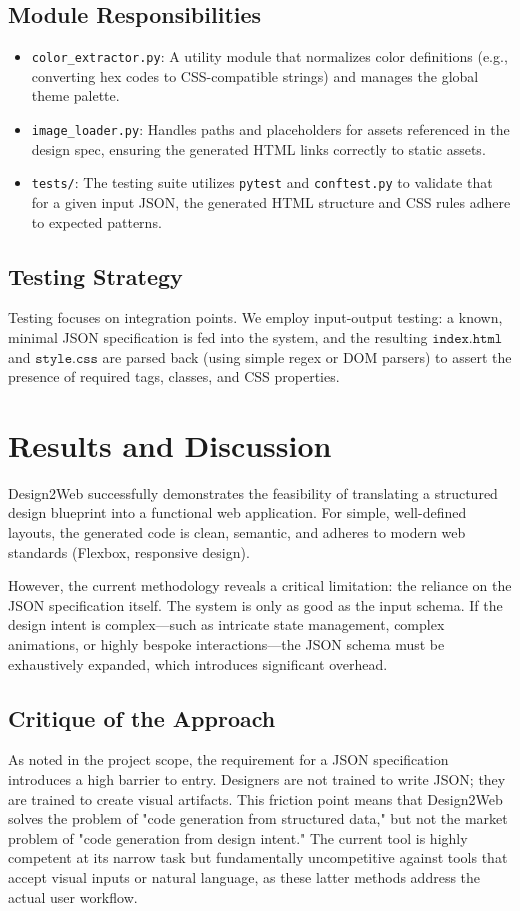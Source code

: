 \documentclass[11pt,a4paper]{article}
\begin{document}
\subsection{Module Responsibilities}
\begin{itemize}
    \item \texttt{color\_extractor.py}: A utility module that normalizes color definitions (e.g., converting hex codes to CSS-compatible strings) and manages the global theme palette.
    \item \texttt{image\_loader.py}: Handles paths and placeholders for assets referenced in the design spec, ensuring the generated HTML links correctly to static assets.
    \item \texttt{tests/}: The testing suite utilizes \texttt{pytest} and \texttt{conftest.py} to validate that for a given input JSON, the generated HTML structure and CSS rules adhere to expected patterns.
\end{itemize}

\subsection{Testing Strategy}
Testing focuses on integration points. We employ input-output testing: a known, minimal JSON specification is fed into the system, and the resulting $\texttt{index.html}$ and $\texttt{style.css}$ are parsed back (using simple regex or DOM parsers) to assert the presence of required tags, classes, and CSS properties.

\section{Results and Discussion}
Design2Web successfully demonstrates the feasibility of translating a structured design blueprint into a functional web application. For simple, well-defined layouts, the generated code is clean, semantic, and adheres to modern web standards (Flexbox, responsive design).

However, the current methodology reveals a critical limitation: the reliance on the JSON specification itself. The system is only as good as the input schema. If the design intent is complex—such as intricate state management, complex animations, or highly bespoke interactions—the JSON schema must be exhaustively expanded, which introduces significant overhead.

\subsection{Critique of the Approach}
As noted in the project scope, the requirement for a JSON specification introduces a high barrier to entry. Designers are not trained to write JSON; they are trained to create visual artifacts. This friction point means that Design2Web solves the problem of "code generation from structured data," but not the market problem of "code generation from design intent." The current tool is highly competent at its narrow task but fundamentally uncompetitive against tools that accept visual inputs or natural language, as these latter methods address the actual user workflow.
\end{document}

